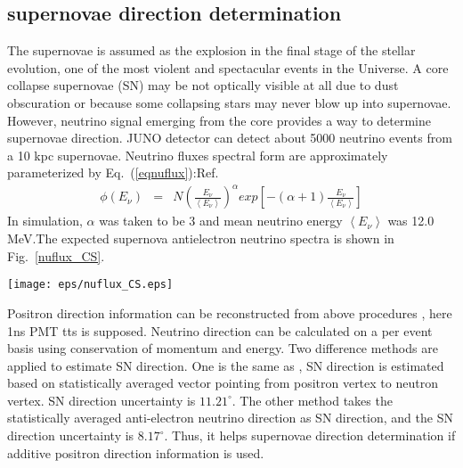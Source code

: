 \documentclass[a4paper,10pt]{cpc-hepnp}
\begin{document}
\subsection{supernovae direction determination }
The supernovae is assumed as the explosion in the final stage of the stellar evolution, one of the most violent and spectacular
events in the Universe. A core collapse supernovae (SN) may be not optically visible at all due to dust obscuration or because
some collapsing stars may never blow up into supernovae. However, neutrino signal emerging from the core provides a way to
determine supernovae direction. JUNO detector can detect about 5000 neutrino events from a 10 kpc supernovae.
Neutrino fluxes spectral form are approximately parameterized by Eq.~(\ref{eqnuflux}):Ref\cite{nuflux}.
\begin{eqnarray}
\label{eqnuflux}
\phi(E_{\nu}) &=& N\left(\frac{E_{\nu}}{ \left< E_{\nu}\right>}\right)^{\alpha}exp\left[ -(\alpha+1)\frac{E_{\nu}}{ \left< E_{\nu}\right>}\right]
\end{eqnarray}
In simulation, $\alpha$ was taken to be 3 and mean neutrino energy $\left< E_{\nu}\right>$ was 12.0 MeV.The expected supernova
antielectron neutrino spectra is shown in Fig.~\ref{nuflux_CS}.
\begin{center}
\texttt{[image: eps/nuflux\_CS.eps]}
\end{center}

Positron direction information can be reconstructed from above procedures , here 1ns PMT tts is supposed.
Neutrino direction can be calculated on a per event basis using conservation of momentum and energy.
Two difference methods are applied to estimate SN direction. One is the same as \cite{nudir},
SN direction is estimated based on statistically averaged vector pointing from positron vertex to neutron vertex.
SN direction uncertainty is $11.21^{\circ}$. The other method takes the statistically averaged
anti-electron neutrino direction as SN direction, and the SN direction uncertainty is $8.17^{\circ}$.
Thus, it helps supernovae direction determination if additive positron direction information is used.
\end{document}

